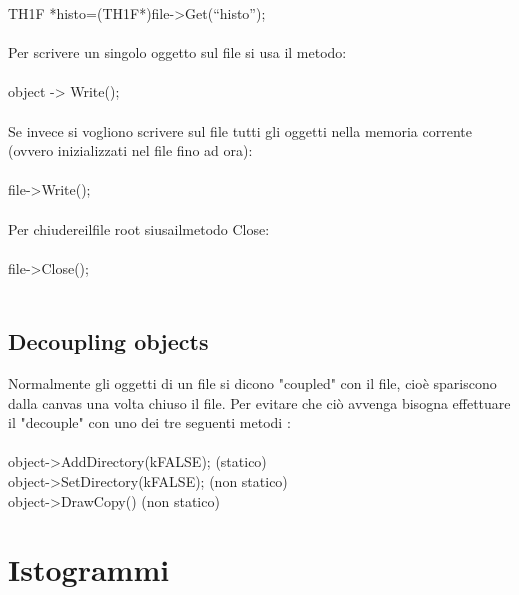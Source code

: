 \documentclass[10pt,a4paper]{article}
\begin{document}
TH1F *histo=(TH1F*)file->Get(“histo”);\\\\
Per scrivere un singolo oggetto sul file si usa il metodo:\\\\
object -> Write();\\\\
Se invece si vogliono scrivere sul file tutti gli oggetti nella memoria corrente (ovvero inizializzati nel file fino ad ora):\\\\
file->Write();\\\\
Per chiudereilfile root siusailmetodo Close:\\\\
file->Close();\\\\
\subsection{Decoupling objects}
Normalmente gli oggetti di un file si dicono "coupled" con il file, cioè spariscono dalla canvas una volta chiuso il file. Per evitare che ciò avvenga bisogna effettuare il "decouple" con uno dei tre seguenti metodi :\\\\
object->AddDirectory(kFALSE); (statico)\\
object->SetDirectory(kFALSE); (non statico)\\
object->DrawCopy() (non statico)

\section{Istogrammi}
\end{document}

